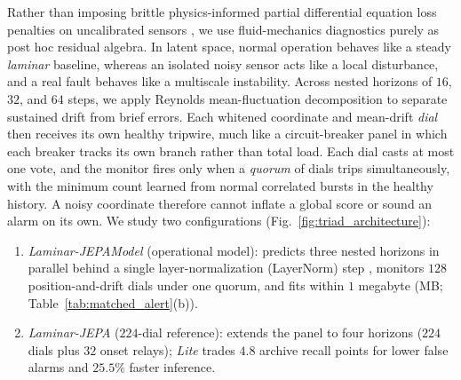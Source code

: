 \documentclass[journal]{IEEEtran}
\begin{document}
Rather than imposing brittle physics-informed partial differential equation loss penalties on uncalibrated sensors \cite{wang2022pinns, rathore2024challenges}, we use fluid-mechanics diagnostics purely as post hoc residual algebra. In latent space, normal operation behaves like a steady \emph{laminar} baseline, whereas an isolated noisy sensor acts like a local disturbance, and a real fault behaves like a multiscale instability. Across nested horizons of $16$, $32$, and $64$ steps, we apply Reynolds mean-fluctuation decomposition \cite{reynolds1895dynamical} to separate sustained drift from brief errors. Each whitened coordinate and mean-drift \emph{dial} then receives its own healthy tripwire, much like a circuit-breaker panel in which each breaker tracks its own branch rather than total load. Each dial casts at most one vote, and the monitor fires only when a \emph{quorum} of dials trips simultaneously, with the minimum count learned from normal correlated bursts in the healthy history. A noisy coordinate therefore cannot inflate a global score or sound an alarm on its own. We study two configurations (Fig.~\ref{fig:triad_architecture}):
\begin{enumerate}[leftmargin=*, nosep, itemsep=1pt]
    \item \emph{Laminar-JEPAModel} (operational model): predicts three nested horizons in parallel behind a single layer-normalization (LayerNorm) step \cite{ba2016layernormalization}, monitors $128$ position-and-drift dials under one quorum, and fits within $1$ megabyte (MB; Table~\ref{tab:matched_alert}(b)).
    \item \emph{Laminar-JEPA} ($224$-dial reference): extends the panel to four horizons ($224$ dials plus $32$ onset relays); \emph{Lite} trades $4.8$ archive recall points for lower false alarms and $25.5\%$ faster inference.
\end{enumerate}
\end{document}

